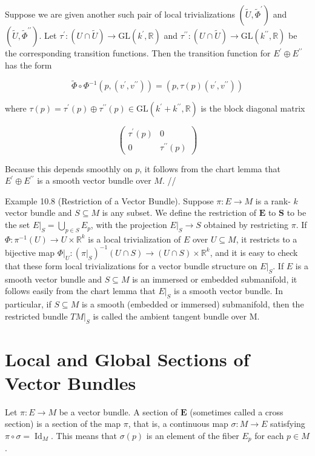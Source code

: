 \documentclass[10pt]{article}
\begin{document}
Suppose we are given another such pair of local trivializations $\left(\tilde{U}, \tilde{\Phi}^{\prime}\right)$ and $\left(\tilde{U}, \widetilde{\Phi}^{\prime \prime}\right)$. Let $\tau^{\prime}:(U \cap \tilde{U}) \rightarrow \mathrm{GL}\left(k^{\prime}, \mathbb{R}\right)$ and $\tau^{\prime \prime}:(U \cap \tilde{U}) \rightarrow \mathrm{GL}\left(k^{\prime \prime}, \mathbb{R}\right)$ be the corresponding transition functions. Then the transition function for $E^{\prime} \oplus E^{\prime \prime}$ has the form

$$
\widetilde{\Phi} \circ \Phi^{-1}\left(p,\left(v^{\prime}, v^{\prime \prime}\right)\right)=\left(p, \tau(p)\left(v^{\prime}, v^{\prime \prime}\right)\right)
$$

where $\tau(p)=\tau^{\prime}(p) \oplus \tau^{\prime \prime}(p) \in \mathrm{GL}\left(k^{\prime}+k^{\prime \prime}, \mathbb{R}\right)$ is the block diagonal matrix

$$
\left(\begin{array}{cc}
\tau^{\prime}(p) & 0 \\
0 & \tau^{\prime \prime}(p)
\end{array}\right)
$$

Because this depends smoothly on $p$, it follows from the chart lemma that $E^{\prime} \oplus E^{\prime \prime}$ is a smooth vector bundle over $M$. //

Example 10.8 (Restriction of a Vector Bundle). Suppose $\pi: E \rightarrow M$ is a rank- $k$ vector bundle and $S \subseteq M$ is any subset. We define the restriction of $\boldsymbol{E}$ to $\boldsymbol{S}$ to be the set $\left.E\right|_{S}=\bigcup_{p \in S} E_{p}$, with the projection $\left.E\right|_{S} \rightarrow S$ obtained by restricting $\pi$. If $\Phi: \pi^{-1}(U) \rightarrow U \times \mathbb{R}^{k}$ is a local trivialization of $E$ over $U \subseteq M$, it restricts to a bijective map $\left.\Phi\right|_{U}:\left(\left.\pi\right|_{S}\right)^{-1}(U \cap S) \rightarrow(U \cap S) \times \mathbb{R}^{k}$, and it is easy to check that these form local trivializations for a vector bundle structure on $\left.E\right|_{S}$. If $E$ is a smooth vector bundle and $S \subseteq M$ is an immersed or embedded submanifold, it follows easily from the chart lemma that $\left.E\right|_{S}$ is a smooth vector bundle. In particular, if $S \subseteq M$ is a smooth (embedded or immersed) submanifold, then the restricted bundle $\left.T M\right|_{S}$ is called the ambient tangent bundle over M.

\section*{Local and Global Sections of Vector Bundles}
Let $\pi: E \rightarrow M$ be a vector bundle. A section of $\boldsymbol{E}$ (sometimes called a cross section) is a section of the map $\pi$, that is, a continuous map $\sigma: M \rightarrow E$ satisfying $\pi \circ \sigma=\operatorname{Id}_{M}$. This means that $\sigma(p)$ is an element of the fiber $E_{p}$ for each $p \in M$.
\end{document}
